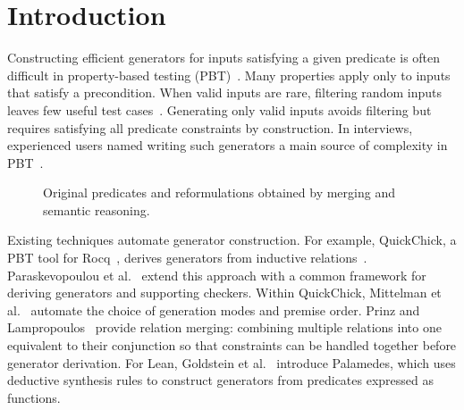 \section{Introduction}
\label{sec:introduction}

Constructing efficient generators for inputs satisfying a given predicate is
often difficult in property-based testing (PBT)~\cite{claessen00quickcheck}.
Many properties apply only to inputs that satisfy a precondition.
When valid inputs are rare, filtering random inputs leaves few useful test
cases~\cite{lampropoulos18generators}.
Generating only valid inputs avoids filtering but requires satisfying all
predicate constraints by construction.
In interviews, experienced users named writing such generators a main source
of complexity in PBT~\cite{goldstein24practice}.

\begin{figure}[!b]
  
  \caption{Original predicates and reformulations obtained by merging and
    semantic reasoning.}
  \label{fig:intro-reformulation}
\end{figure}

Existing techniques automate generator construction.
For example, QuickChick, a PBT tool for Rocq~\cite{paraskevopoulou15foundational},
derives generators from inductive relations~\cite{lampropoulos18generators}.
Paraskevopoulou et al.~\cite{paraskevopoulou22computing} extend this approach
with a common framework for deriving generators and supporting checkers.
Within QuickChick, Mittelman et al.~\cite{mittelman26testing} automate the
choice of generation modes and premise order.
Prinz and Lampropoulos~\cite{prinz23merging} provide relation merging:
combining multiple relations into one equivalent to their conjunction so that
constraints can be handled together before generator derivation.
For Lean, Goldstein et al.~\cite{goldstein26palamedes} introduce Palamedes,
which uses deductive synthesis rules to construct generators from predicates
expressed as functions.

